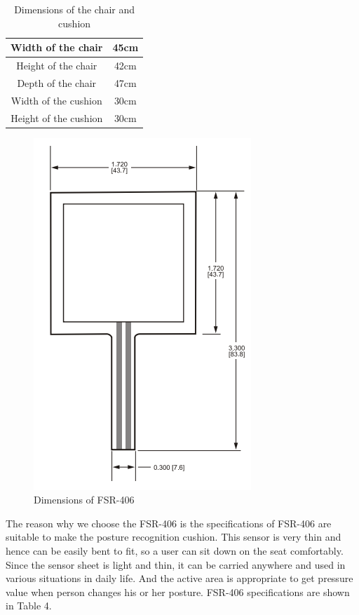 \documentclass[conference]{IEEEtran}
\begin{document}
 \begin{table}[h]
{\renewcommand\arraystretch{1.25}
\caption{Dimensions of the chair and cushion}
\begin{tabular}{|c|cc}  \hline\hline
Width of the chair& \multicolumn{2}{p{5cm}|}{\raggedright 45cm} \\ \hline
Height of the chair& \multicolumn{2}{p{5cm}|}{\raggedright 42cm} \\ \hline
Depth of the chair& \multicolumn{2}{p{5cm}|}{\raggedright 47cm} \\ \hline
Width of the cushion& \multicolumn{2}{p{5cm}|}{\raggedright 30cm} \\ \hline
Height of the cushion& \multicolumn{2}{p{5cm}|}{\raggedright 30cm} \\ \hline \hline
\end{tabular}}
\end{table}


\begin{figure}[H]
\begin{center}
    \includegraphics[scale=0.6]{img_06.png}
    \caption{Dimensions of FSR-406} 
\end{center}
\end{figure}

The reason why we choose the FSR-406 is the specifications of FSR-406 are suitable to make the posture recognition cushion. This sensor is very thin and hence can be easily bent to fit, so a user can sit down on the seat comfortably. Since the sensor sheet is light and thin, it can be carried anywhere and used in various situations in daily life. And the active area is appropriate to get pressure value when person changes his or her posture. FSR-406 specifications are shown in Table 4.
\end{document}
